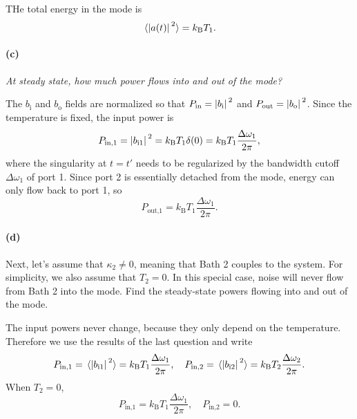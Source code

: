 \documentclass[hyperref, a4paper]{article}
\newcommand*{\kB}{k_{\text{B}}}
\newcommand*{\bi}{b_{\text{i}}}
\newcommand*{\bo}{b_{\text{o}}}
\newcommand*{\bii}[1]{b_{\text{i#1}}}
\begin{document}
THe total energy in the mode is 
\begin{equation}
    \expval*{\abs*{a(t)}^2} = \kB T_1.
\end{equation}

\paragraph*{(c)} \textit{At steady state, how much power flows into and out of the mode?} 

The $\bi$ and $\bo$ fields are normalized so that $P_{\text{in}} = \abs*{\bi}^2$ 
and $P_{\text{out}} = \abs*{\bo}^2$.
Since the temperature is fixed, the input power is 
\begin{equation}
    P_{\text{in,1}} = \abs*{\bii{1}}^2 = \kB T_1 \delta(0) = \kB T_1 \frac{\Delta \omega_1}{2\pi},
\end{equation}
where the singularity at $t = t'$ needs to be regularized by 
the bandwidth cutoff $\Delta \omega_1$ of port 1.
Since port 2 is essentially detached from the mode, energy can only flow back to port 1, so 
\begin{equation}
    P_{\text{out,1}} = \kB T_1 \frac{\Delta \omega_1}{2\pi}.
\end{equation} 

\paragraph*{(d)} Next, let's assume that $\kappa_2 \neq 0$, meaning that Bath 2 couples to the system. For simplicity, we also assume that $T_2=0$. In this special case, noise will never flow from Bath 2 into the mode. Find the steady-state powers flowing into and out of the mode.

The input powers never change, because they only depend on the temperature.
Therefore we use the results of the last question and write 
\begin{equation}
    P_{\text{in,1}} = \expval*{\abs*{\bii{1}}^2} = \kB T_1 \frac{\Delta \omega_1}{2\pi}, \quad 
    P_{\text{in,2}} = \expval*{\abs*{\bii{2}}^2} = \kB T_2 \frac{\Delta \omega_2}{2\pi}.
\end{equation} 
When $T_2 = 0$,
\begin{equation}
    P_{\text{in,1}} = \kB T_1 \frac{\Delta \omega_1}{2\pi}, \quad 
    P_{\text{in,2}} = 0.
\end{equation}
\end{document}
